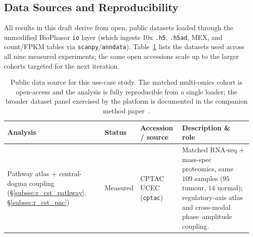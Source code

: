 \documentclass[preprint,12pt,amsmath,amssymb,superscriptaddress,floatfix]{revtex4-2}
\begin{document}
\subsection{Data Sources and Reproducibility}
\label{subsec:data_sources}

All results in this draft derive from open, public datasets loaded through
the unmodified BioPhasor \texttt{io} layer (which ingests 10x \texttt{.h5},
\texttt{.h5ad}, MEX, and count/FPKM tables via \texttt{scanpy}/\texttt{anndata}).
Table~\ref{tab:datasources} lists the datasets used across all nine measured
experiments; the same open accessions scale up to the larger cohorts targeted
for the next iteration.

\begin{table}[t]
\centering
\caption{Public data source for this use-case study. The matched multi-omics
cohort is open-access and the analysis is fully reproducible from a single
loader; the broader dataset panel exercised by the platform is documented in the
companion method paper~\cite{biophasor_platform}.}
\label{tab:datasources}
\begin{tabular}{p{3.4cm}p{1.5cm}p{3.4cm}p{5.8cm}}
\toprule
\textbf{Analysis} & \textbf{Status} & \textbf{Accession / source} & \textbf{Description \& role} \\
\midrule
Pathway atlas + central-dogma coupling
(\S\ref{subsec:r_cst_pathway},\,\S\ref{subsec:r_cst_pac}) & Measured &
CPTAC UCEC (\texttt{cptac}) &
Matched RNA-seq + mass-spec proteomics, same $109$ samples ($95$ tumour,
$14$ normal); regulatory-axis atlas and cross-modal phase--amplitude coupling. \\
\bottomrule
\end{tabular}
\end{table}
\end{document}
